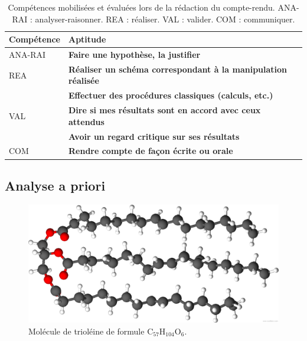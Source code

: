 \documentclass[12pt,a4paper]{article}
\newcommand{\rea}{\colorbox{yellow_c}{\textcolor{yellow_f}{REA}}}
\newcommand{\anarai}{\colorbox{green_c}{\textcolor{green_f}{ANA-RAI}}}
\newcommand{\val}{\colorbox{orange_c}{\textcolor{orange_f}{VAL}}}
\newcommand{\com}{\colorbox{red_c}{\textcolor{red_f}{COM}}}
\begin{document}
\begin{table}
\center
\begin{tabular}{l|l}
\textbf{Compétence} & \textbf{Aptitude} \\
\hline \hline
\anarai 	& \textbf{Faire une hypothèse, la justifier} \\
\hline
\rea			& \textbf{Réaliser un schéma correspondant à la manipulation réalisée} \\
				& \textbf{Effectuer des procédures classiques (calculs, etc.)} \\
\hline
\val			& \textbf{Dire si mes résultats sont en accord avec ceux attendus} \\
 				& \textbf{Avoir un regard critique sur ses résultats} \\
\hline
\com		& \textbf{Rendre compte de façon écrite ou orale}
\end{tabular}
\caption{Compétences mobilisées et évaluées lors de la rédaction du compte-rendu.
\anarai{} : analyser-raisonner.
\rea{} : réaliser.
\val{} : valider.
\com{} : communiquer.}
\label{tab:cptces_cr}
\end{table}

\subsection{Analyse a priori}

\begin{figure}
\center
\includegraphics[scale=0.2]{oleine.png}
\caption{Molécule de trioléine de formule $\text{C}_\text{57}\text{H}_\text{104}\text{O}_\text{6}$.}
\label{fig:trioleine}
\end{figure}
\end{document}
